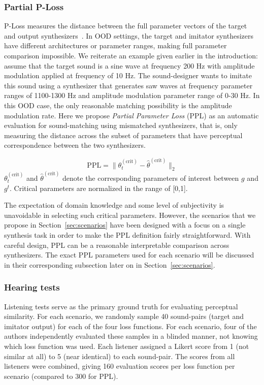 \documentclass[10pt]{article} %
\begin{document}
\subsubsection{Partial P-Loss}
\label{sec:partial_ploss}
 P-Loss measures the distance between the full parameter vectors of the target and output synthesizers~\cite{yee2018automatic}. In OOD settings, the target and imitator synthesizers have different architectures or parameter ranges, making full parameter comparison impossible. We reiterate an example given earlier in the introduction: assume that the target sound is a sine wave at frequency 200 Hz with amplitude modulation applied at frequency of 10 Hz. The sound-designer wants to imitate this sound using a synthesizer that generates saw waves at frequency parameter ranges of 1100-1300 Hz and amplitude modulation parameter range of 0-30 Hz. In this OOD case, the only reasonable matching possibility is the amplitude modulation rate. Here we propose \emph{Partial Parameter Loss} (PPL) as an automatic evaluation for sound-matching using mismatched synthesizers, that is, only measuring the distance across the subset of parameters that have perceptual correspondence between the two synthesizers.

\begin{equation}
\mathrm{PPL} = \| \theta^{(\mathrm{crit})}_t - \hat{\theta}^{(\mathrm{crit})} \|_2
\end{equation}
$\theta^{(\mathrm{crit})}_t$ and $\hat{\theta}^{(\mathrm{crit})}$ denote the corresponding parameters of interest between $g$ and $g^t$.  Critical parameters are normalized in the range of [0,1].

The expectation of domain knowledge and some level of subjectivity is unavoidable in selecting such critical parameters. However, the scenarios that we propose in Section~\ref{sec:scenarios} have been designed with a focus on a single synthesis task in order to make the PPL definition fairly straightforward. With careful design, PPL can be a reasonable interpretable comparison across synthesizers. The exact PPL parameters used for each scenario will be discussed in their corresponding subsection later on in Section~\ref{sec:scenarios}.

\subsubsection{Hearing tests}
Listening tests serve as the primary ground truth for evaluating perceptual similarity. For each scenario, we randomly sample 40 sound-pairs (target and imitator output) for each of the four loss functions. For each scenario, four of the authors independently evaluated these samples in a blinded manner, not knowing which loss function was used. Each listener assigned a Likert score from 1 (not similar at all) to 5 (near identical) to each sound-pair. The scores from all listeners were combined, giving 160 evaluation scores per loss function per scenario (compared to 300 for PPL).
\end{document}
